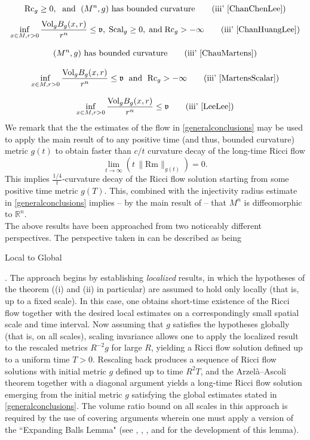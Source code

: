 \documentclass{amsart}
\theoremstyle{definition}
\newcommand{\Rm}{\mathrm{Rm}}
\newcommand{\Rc}{\mathrm{Rc}}
\newcommand{\Vol}{\mathrm{Vol}}
\begin{document}
    \[
    \Rc_g\geq 0, \; \text{ and } \; (M^n,g) \text{ has bounded curvature}  \tag{iii' \cite{ChanChenLee}}
    \]
    \[
    \inf_{x\in M, r>0}\frac{\Vol_{g}B_g(x,r)}{r^n}\leq \mathfrak{v}, \; \mathrm{Scal}_g\geq 0, \; \text{and} \; \Rc_g>-\infty \tag{iii' \cite{ChanHuangLee}}
    \]   
    
    

      \[
    (M^n,g) \text{ has bounded curvature}\tag{iii' \cite{ChauMartens}}
    \]
    
    

    
    \[
    \inf_{x\in M, r>0}\frac{\Vol_{g}B_g(x,r)}{r^n}\leq \mathfrak{v} \; \text{ and } \; \Rc_g>-\infty \tag{iii' \cite{MartensScalar}}
    \]


    \[
    \inf_{x\in M, r>0}\frac{\Vol_{g}B_g(x,r)}{r^n}\leq \mathfrak{v} \tag{iii' \cite{LeeLee}}
    \]
  We remark that the the estimates of the flow in \eqref{generalconclusions} may be used to apply the main result of \cite{ChauMartens} to any positive time (and thus, bounded curvature) metric $g(t)$  to obtain faster than $c/t$ curvature decay of the long-time Ricci flow
\[
\lim_{t\to\infty} 
\left( t\, \| \Rm\|_{g(t)}\right)
=0.
\]
This implies $\frac{1/4}{t}$-curvature decay of the Ricci flow solution starting from some positive time metric $g(T)$. This, combined with the injectivity radius estimate in \eqref{generalconclusions} implies – by the main result of \cite{HuangPeng} – that $M^n$ is diffeomorphic to $\mathbb{R}^n$.\\
 
The above results have been approached from two noticeably different perspectives. The perspective taken in \cite{ChanChenLee, ChanHuangLee,  MartensScalar,  LeeLee} can be described as being \begin{it}Local to Global\end{it}.  The approach begins by establishing \textit{localized} results, in which the hypotheses of the theorem ((i) and (ii) in particular) are assumed to hold only locally (that is, up to a fixed scale). In this case, one obtains short-time existence of the Ricci flow together with the desired local estimates on a correspondingly small spatial scale and time interval. Now assuming that $g$ satisfies  the hypotheses globally (that is, on all scales), scaling invariance allows one to apply the localized result to the rescaled metrics $R^{-2}g$ for large $R$, yielding a Ricci flow solution defined up to a uniform time $T>0$. Rescaling back produces a sequence of Ricci flow solutions with initial metric $g$ defined up to time $R^2T$, and the Arzel\`a--Ascoli theorem together with a diagonal argument yields a long-time Ricci flow solution emerging from the initial metric $g$ satisfying the global estimates stated in \eqref{generalconclusions}.   The volume ratio bound on all scales in this approach is required by the use of covering arguments  wherein one must apply a version of the ``Expanding Balls Lemma" (see {\cite[Lemma 3.7]{Fei}}, {\cite[Lemma 2.2]{LeeTam}}, {\cite[Lemma 4.2]{Martens}}, and {\cite[Lemma 2.3]{MartensScalar}} for the development of this lemma).   
  
\end{document}
